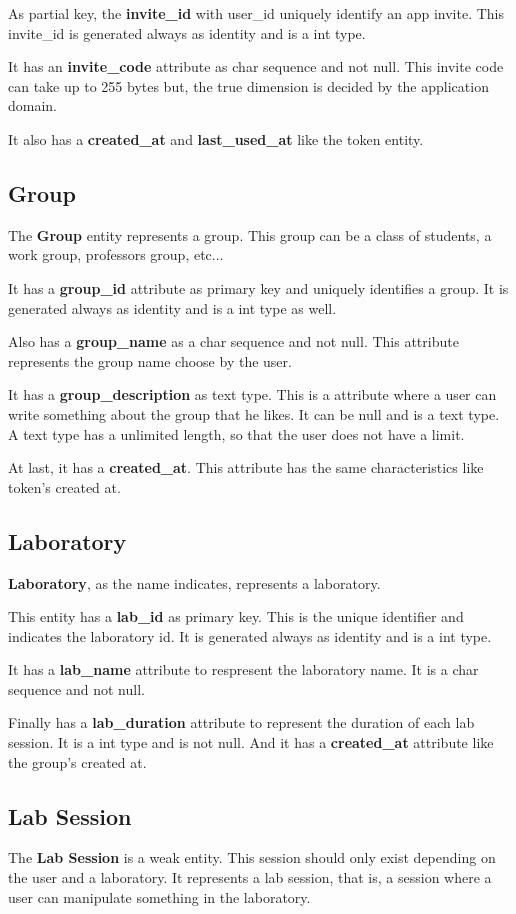 \documentclass[a4paper,twoside,11pt]{article}
\begin{document}
As partial key, the \textbf{invite\_id} with user\_id uniquely identify an app invite. This invite\_id is generated always as identity and is a int type.

It has an \textbf{invite\_code} attribute as char sequence and not null. This invite code can take up to 255 bytes but, the true dimension is decided by the application domain.

It also has a \textbf{created\_at} and \textbf{last\_used\_at} like the token entity.

\subsection*{Group}
The \textbf{Group} entity represents a group. This group can be a class of students, a work group, professors group, etc...

It has a \textbf{group\_id} attribute as primary key and uniquely identifies a group. It is generated always as identity and is a int type as well.

Also has a \textbf{group\_name} as a char sequence and not null. This attribute represents the group name choose by the user.

It has a \textbf{group\_description} as text type. This is a attribute where a user can write something about the group that he likes. It can be null and is a text type.
A text type has a unlimited length, so that the user does not have a limit.

At last, it has a \textbf{created\_at}. This attribute has the same characteristics like token's created at.

\subsection*{Laboratory}
\textbf{Laboratory}, as the name indicates, represents a laboratory. 

This entity has a \textbf{lab\_id} as primary key. This is the unique identifier and indicates the laboratory id. It is generated always as identity and is a int type.

It has a \textbf{lab\_name} attribute to respresent the laboratory name. It is a char sequence and not null.

Finally has a \textbf{lab\_duration} attribute to represent the duration of each lab session. It is a int type and is not null. 
And it has a \textbf{created\_at} attribute like the group's created at.

\subsection*{Lab Session}
The \textbf{Lab Session} is a weak entity. This session should only exist depending on the user and a laboratory. It represents a lab session, that is, a session where a user can manipulate something in the laboratory.
\end{document}

